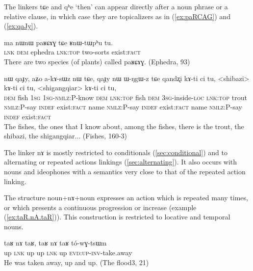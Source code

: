 \documentclass[oldfontcommands,oneside,a4paper,11pt]{article}
\newcommand{\ipa}[1]{{\phon \mbox{#1}}} %
\newcommand{\refb}[1]{(\ref{#1})}
\begin{document}
The linkers   \ipa{tɕe} and \ipa{qʰe} `then'  can appear directly after a noun phrase or a relative clause, in which case they are topicalizers as in \refb{ex:paRCAG} and \refb{ex:qaJy}.


 \begin{exe}
\ex \label{ex:paRCAG} 
\gll
\ipa{ma}   	\ipa{nɯnɯ}   	\ipa{paʁɕɤɣ}   	\ipa{tɕe}   	\ipa{ʁnɯ-tɯpʰu}   	\ipa{tu.}   \\
\textsc{lnk} \textsc{dem} ephedra \textsc{lnk:top} two-sorts exist:\textsc{fact} \\
\glt There are two species (of plants) called \ipa{paʁɕɤɣ}. (Ephedra, 93)
\end{exe}

 \begin{exe}
\ex \label{ex:qaJy} 
\gll
\ipa{nɯ}  	\ipa{qaɟy,}  	\ipa{aʑo}  	\ipa{a-kɤ-sɯz}  	\ipa{nɯ}  	\ipa{tɕe,}  	\ipa{qaɟy}  	\ipa{nɯ}  	\ipa{ɯ-ŋgɯ-z}  	\ipa{tɕe}  	\ipa{qandʐi}  	\ipa{kɤ-ti}  	\ipa{ci}  	\ipa{tu,}  	<shibazi>  	\ipa{kɤ-ti}  	\ipa{ci}  	\ipa{tu,}  	<shigangqiar>  	\ipa{kɤ-ti}  	\ipa{ci}  	\ipa{tu,}  \\
\textsc{dem} fish \textsc{1sg} \textsc{1sg-nmlz:P}-know \textsc{dem} \textsc{lnk:top} fish \textsc{dem} \textsc{3sg}-inside-\textsc{loc} \textsc{lnk:top}  trout \textsc{nmlz}:P-say \textsc{indef} exist:\textsc{fact}   name  \textsc{nmlz}:P-say \textsc{indef} exist:\textsc{fact}   name  \textsc{nmlz}:P-say \textsc{indef} exist:\textsc{fact}  \\
\glt The fishes, the ones that I know about, among the fishes, there is the trout, the shibazi, the shigangqiar... (Fishes, 160-3)
\end{exe}

The linker \ipa{nɤ} is mostly restricted to conditionals \refb{sec:conditional} and to alternating or repeated actions linkings \refb{sec:alternating}. It also occurs with nouns  and ideophones with a semantics very close to that of the repeated action linking. 

The structure noun+\ipa{nɤ}+noun   expresses an action which is repeated many times, or which presents a continuous progression or increase   (example \refb{ex:taR.nA.taR}). This construction is   restricted to locative and temporal nouns. 

 \begin{exe}
\ex \label{ex:taR.nA.taR} 
\gll
\ipa{taʁ}   	\ipa{nɤ}   	\ipa{taʁ,}   	\ipa{taʁ}   	\ipa{nɤ}   	\ipa{taʁ}   	\ipa{tó-wɣ-tsɯm}   \\
up \textsc{lnk} up up \textsc{lnk} up \textsc{evd:up-inv-}take.away \\
\glt He was taken away, up and up. (The flood3, 21)
\end{exe}
\end{document}
